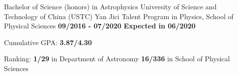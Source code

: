 
\begin{cventries}
  \cventry
    {\textnormal{Bachelor of Science (honors) in Astrophysics}} 
    {University of Science and Technology of China (USTC)\newline
    \textnormal{Yan Jici Talent Program in Physics, School of Physical Sciences}} 
    {\textcolor{awesome-emerald}{\textbf{09/2016 - 07/2020}}}
    {\textcolor{awesome-emerald}{\textbf{Expected in 06/2020}}}
    {
      \begin{cvitems} %
         \item{\textnormal{Cumulative GPA:} \textbf{3.87/4.30}}
         \item{\textnormal{Ranking:} \textbf{1/29} \textnormal{in Department of Astronomy}
         \newline
         \hspace{1.3cm}\textbf{16/336} \textnormal{in School of Physical Sciences}}
      \end{cvitems}
    }
  \vspace{-0.4cm}
\end{cventries}
